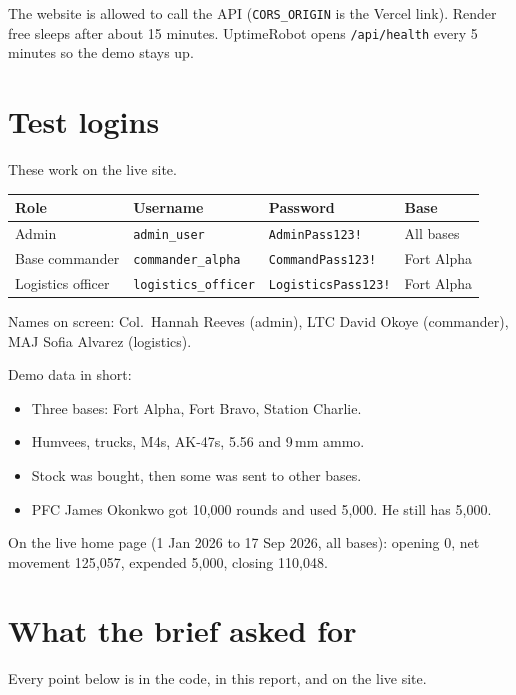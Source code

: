 \documentclass[11pt,a4paper]{article}
\begin{document}
The website is allowed to call the API (\texttt{CORS\_ORIGIN} is the Vercel link). Render free sleeps after about 15 minutes. UptimeRobot opens \texttt{/api/health} every 5 minutes so the demo stays up.

\section{Test logins}

These work on the live site.

\begin{center}
\begin{tabular}{llll}
\toprule
\textbf{Role} & \textbf{Username} & \textbf{Password} & \textbf{Base} \\
\midrule
Admin & \texttt{admin\_user} & \texttt{AdminPass123!} & All bases \\
Base commander & \texttt{commander\_alpha} & \texttt{CommandPass123!} & Fort Alpha \\
Logistics officer & \texttt{logistics\_officer} & \texttt{LogisticsPass123!} & Fort Alpha \\
\bottomrule
\end{tabular}
\end{center}

Names on screen: Col.\ Hannah Reeves (admin), LTC David Okoye (commander), MAJ Sofia Alvarez (logistics).

Demo data in short:

\begin{itemize}
  \item Three bases: Fort Alpha, Fort Bravo, Station Charlie.
  \item Humvees, trucks, M4s, AK-47s, 5.56 and 9\,mm ammo.
  \item Stock was bought, then some was sent to other bases.
  \item PFC James Okonkwo got 10{,}000 rounds and used 5{,}000. He still has 5{,}000.
\end{itemize}

On the live home page (1 Jan 2026 to 17 Sep 2026, all bases): opening 0, net movement 125{,}057, expended 5{,}000, closing 110{,}048.

\section{What the brief asked for}

Every point below is in the code, in this report, and on the live site.
\end{document}
